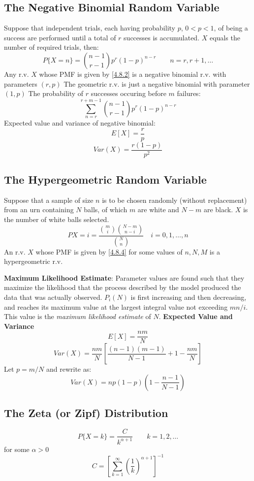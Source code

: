 \documentclass[openany]{book}
\numberwithin{equation}{section}
\begin{document}
\begin{flushleft}
\subsection{The Negative Binomial Random Variable}
Suppose that independent trials, each having probability $p$, $0<p<1$, of being a
success are performed until a total of $r$ successes is accumulated. $X$ equals the number of required trials, then:
\begin{equation}
P\{X=n\}=\binom{n-1}{r-1}p^r(1-p)^{n-r} \qquad n=r,r+1,\dots \label{4.8.2}
\end{equation}
Any r.v. $X$ whose PMF is given by \eqref{4.8.2} is a negative binomial r.v. with parameters $(r,p)$ \medbreak
The geometric r.v. is just a negative binomial with parameter $(1,p)$ \medbreak
The probability of $r$ successes occuring before $m$ failures:
\[\sum_{n=r}^{r+m-1}\binom{n-1}{r-1}p^r(1-p)^{n-r}
\]
Expected value and variance of negative binomial:
\[E[X]=\frac{r}{p}
\]
\[Var(X)=\frac{r(1-p)}{p^2}
\]
\subsection{The Hypergeometric Random Variable}
Suppose that a sample of size $n$ is to be chosen randomly (without replacement) from an urn containing $N$ balls, of which $m$ are white and $N-m$ are black. $X$ is the number of white balls selected.
\[P{X=i}=\frac{\binom{m}{i}\binom{N-m}{n-i}}{\binom{N}{n}} \quad i=0,1,\dots,n \tag{4.8.4} \label{4.8.4}
\]
An r.v. $X$ whose PMF is given by \eqref{4.8.4} for some values of $n,N,M$ is a hypergeometric r.v.\medbreak

\textbf{Maximum Likelihood Estimate}: Parameter values are found such that they maximize the likelihood that the process described by the model produced the data that was actually observed.\medbreak
$P_i(N)$ is first increasing and then decreasing, and reaches its maximum value
at the largest integral value not exceeding $mn/i$. This value is the \textit{maximum likelihood estimate} of $N$. \medbreak
\textbf{Expected Value and Variance}
\[E[X]=\frac{nm}{N}
\]
\[Var(X)=\frac{nm}{N}[\frac{(n-1)(m-1)}{N-1}+1-\frac{nm}{N}]
\]
Let $p=m/N$ and rewrite as:
\[Var(X)=np(1-p)(1-\frac{n-1}{N-1})
\]
\subsection{The Zeta (or Zipf) Distribution}
\[P\{X=k\}=\frac{C}{k^{\alpha +1}} \qquad k=1,2,\dots
\]
for some $\alpha>0$
\[C=\left[\sum_{k=1}^{\infty}(\frac{1}{k})^{\alpha+1} \right]^{-1}
\]

\end{flushleft}
\end{document}
